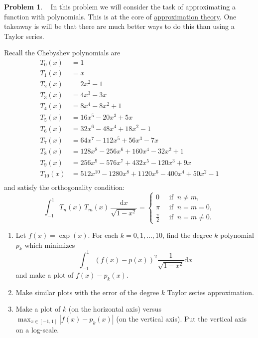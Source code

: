\documentclass[12pt]{article}
\theoremstyle{definition}
\newtheorem{problem}{Problem}
\renewcommand{\d}{\mathrm{d}}
\begin{document}
\begin{problem}~
    In this problem we will consider the task of approximating a function with polynomials.
    This is at the core of \href{https://en.wikipedia.org/wiki/Approximation_theory}{approximation theory}.
    One takeaway is will be that there are much better ways to do this than using a Taylor series.


    Recall the Chebyshev polynomials are 
    \begin{align*}
    T_0(x) &= 1 \\
    T_1(x) &= x \\
    T_2(x) &= 2x^2 - 1 \\
    T_3(x) &= 4x^3 - 3x \\
    T_4(x) &= 8x^4 - 8x^2 + 1 \\
    T_5(x) &= 16x^5 - 20x^3 + 5x \\
    T_6(x) &= 32x^6 - 48x^4 + 18x^2 - 1 \\
    T_7(x) &= 64x^7 - 112x^5 + 56x^3 - 7x \\
    T_8(x) &= 128x^8 - 256x^6 + 160x^4 - 32x^2 + 1 \\
    T_9(x) &= 256x^9 - 576x^7 + 432x^5 - 120x^3 + 9x \\
    T_{10}(x) &= 512x^{10} - 1280x^8 + 1120x^6 - 400x^4 + 50x^2-1 \\
    \end{align*}
    and satisfy the orthogonality condition:
    \begin{equation*}
        \int_{-1}^1 T_n(x)\,T_m(x)\,\frac{\mathrm{d}x}{\sqrt{1-x^2}} = 
        \begin{cases}
        0             & ~\text{ if }~ n \ne m, \\
        \pi           & ~\text{ if }~ n=m=0, \\
        \frac{\pi}{2} & ~\text{ if }~ n=m \ne 0.
        \end{cases}
    \end{equation*}
    \begin{enumerate}
        \item Let $f(x) = \exp(x)$.
        For each $k=0,1,\ldots, 10$, find the degree $k$ polynomial $p_k$ which minimizes 
        \[
            \int_{-1}^{1} (f(x) - p(x))^2 \frac{1}{\sqrt{1-x^2}}\d{x} 
        \] 
        and make a plot of $f(x) - p_k(x)$.

        \item Make similar plots with the error of the degree $k$ Taylor series approximation.

        \item Make a plot of $k$ (on the horizontal axis) versus $\max_{x\in[-1,1]} |f(x) - p_k(x)|$ (on the vertical axis).
        Put the vertical axis on a log-scale. 
        

\end{enumerate}
\end{problem}
\end{document}
